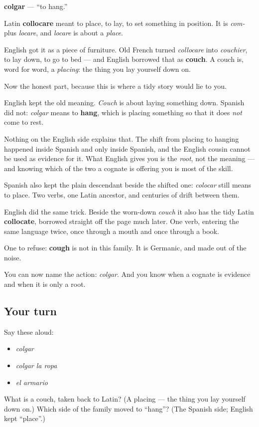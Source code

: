 \begin{cousinweb}
\textbf{colgar} — \textquotedblleft{}to hang.\textquotedblright{}

Latin \textbf{collocare} meant to place, to lay, to set something in position. It is \emph{com-} plus \emph{locare}, and \emph{locare} is about a \emph{place}.

English got it as a piece of furniture. Old French turned \emph{collocare} into \emph{couchier}, to lay down, to go to bed — and English borrowed that as \textbf{couch}. A couch is, word for word, a \emph{placing}: the thing you lay yourself down on.

Now the honest part, because this is where a tidy story would lie to you.

English kept the old meaning. \emph{Couch} is about laying something down. Spanish did not: \emph{colgar} means to \textbf{hang}, which is placing something so that it does \emph{not} come to rest.

Nothing on the English side explains that. The shift from placing to hanging happened inside Spanish and only inside Spanish, and the English cousin cannot be used as evidence for it. What English gives you is the \emph{root}, not the meaning — and knowing which of the two a cognate is offering you is most of the skill.

Spanish also kept the plain descendant beside the shifted one: \emph{colocar} still means to place. Two verbs, one Latin ancestor, and centuries of drift between them.

English did the same trick. Beside the worn-down \emph{couch} it also has the tidy Latin \textbf{collocate}, borrowed straight off the page much later. One verb, entering the same language twice, once through a mouth and once through a book.

One to refuse: \textbf{cough} is not in this family. It is Germanic, and made out of the noise.
\end{cousinweb}

\begin{grammarlens}[title={What you've built}]
You can now name the action: \emph{colgar}. And you know when a cognate is evidence and when it is only a root.
\end{grammarlens}

\subsection*{Your turn}
Say these aloud:

\begin{itemize}
\raggedright
  \item \emph{colgar}
  \item \emph{colgar la ropa}
  \item \emph{el armario}
\end{itemize}

\begin{tcolorbox}[breakable,colback=teal!4,colframe=teal!35!black,title={Before you move on}]
What is a couch, taken back to Latin? (A placing — the thing you lay yourself down on.) Which side of the family moved to \textquotedblleft{}hang\textquotedblright{}? (The Spanish side; English kept \textquotedblleft{}place\textquotedblright{}.)
\end{tcolorbox}
